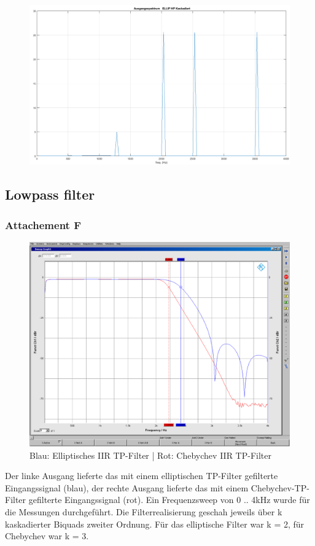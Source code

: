 \begin{figure}
\centering
\includegraphics[width=0.7\linewidth]{Bilder/Attachment_E_ELLIP_HP_Spektrum}
\caption{}
\label{fig:Attachment_E_ELLIP_HP_Spektrum}
\end{figure}



\subsection{Lowpass filter}
\subsubsection{Attachement F}

	\begin{figure}[h]
		\centering
		\includegraphics[width=0.8\linewidth]{Bilder/EllipCheby}
		\caption{Blau: Elliptisches IIR TP-Filter | Rot: Chebychev IIR TP-Filter}
		\label{fig:EllipCheby}
	\end{figure}
	
\noindent Der linke Ausgang lieferte das mit einem elliptischen TP-Filter gefilterte Eingangssignal (blau), der rechte Ausgang lieferte das mit einem Chebychev-TP-Filter gefilterte Eingangssignal (rot). Ein Frequenzsweep von 0 .. 4kHz wurde für die Messungen durchgeführt. Die Filterrealisierung geschah jeweils über k kaskadierter Biquads zweiter Ordnung. Für das elliptische Filter war k = 2, für Chebychev war k = 3.

